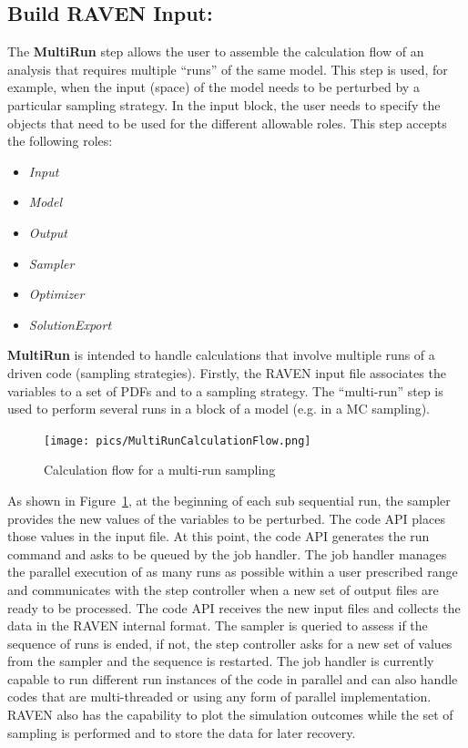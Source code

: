 \subsection{Build RAVEN Input: }
\label{sub:tutorialMultiRun}
The \textbf{MultiRun} step allows the user to assemble the calculation flow of an analysis that requires multiple
``runs'' of the same model. This step is used, for example, when the input (space) of the model needs to be
perturbed by a particular sampling strategy. In the  input block, the user needs to specify the
objects that need to be used for the different allowable roles. This step accepts the following roles:

\begin{itemize}
  \item \textit{Input}
  \item \textit{Model}
  \item \textit{Output}
  \item \textit{Sampler}
  \item \textit{Optimizer}
  \item \textit{SolutionExport}
\end{itemize}

\textbf{MultiRun} is intended to handle calculations that involve multiple runs of a driven code (sampling strategies).
Firstly, the RAVEN input file associates the variables to a set of PDFs and to a sampling strategy. The ``multi-run''
step is used to perform several runs in a block of a model (e.g. in a MC sampling).

\begin{figure}[ht]
  \centering
  \texttt{[image: pics/MultiRunCalculationFlow.png]}
  \caption{Calculation flow for a multi-run sampling}
  \label{fig:multiRun}
\end{figure}

As shown in Figure~\ref{fig:multiRun}, at the beginning of each sub sequential run, the sampler provides the new values of the variables to be perturbed.
The code API places those values in the input file. At this point, the code API generates the run command and asks
to be queued by the job handler. The job handler manages the parallel execution of as many runs as possible within
a user prescribed range and communicates with the step controller when a new set of output files are ready to be
processed. The code API receives the new input files and collects the data in the RAVEN internal format. The sampler
is queried to assess if the sequence of runs is ended, if not, the step controller asks for a new set of values
from the sampler and the sequence is restarted.
The job handler is currently capable to run different run instances of the code in parallel and can also handle
codes that are multi-threaded or using any form of parallel implementation.
RAVEN also has the capability to plot the simulation outcomes while the set of sampling is performed and to store
the data for later recovery.

